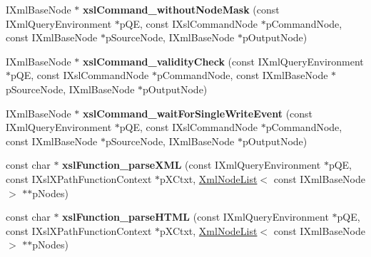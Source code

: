 \begin{DoxyCompactItemize}
\item 
\hypertarget{group__XSLModule-Commands_ga0ed207ec17eee242bc51cd8238386916}{\-I\-Xml\-Base\-Node $\ast$ {\bfseries xsl\-Command\-\_\-without\-Node\-Mask} (const \-I\-Xml\-Query\-Environment $\ast$p\-Q\-E, const \-I\-Xsl\-Command\-Node $\ast$p\-Command\-Node, const \-I\-Xml\-Base\-Node $\ast$p\-Source\-Node, \-I\-Xml\-Base\-Node $\ast$p\-Output\-Node)}\label{group__XSLModule-Commands_ga0ed207ec17eee242bc51cd8238386916}

\item 
\hypertarget{group__XSLModule-Commands_ga8fd8810e91d25af972b38b80036763c5}{\-I\-Xml\-Base\-Node $\ast$ {\bfseries xsl\-Command\-\_\-validity\-Check} (const \-I\-Xml\-Query\-Environment $\ast$p\-Q\-E, const \-I\-Xsl\-Command\-Node $\ast$p\-Command\-Node, const \-I\-Xml\-Base\-Node $\ast$p\-Source\-Node, \-I\-Xml\-Base\-Node $\ast$p\-Output\-Node)}\label{group__XSLModule-Commands_ga8fd8810e91d25af972b38b80036763c5}

\item 
\hypertarget{group__XSLModule-Commands_ga6d37d1c0b9f784350381cee223d718da}{\-I\-Xml\-Base\-Node $\ast$ {\bfseries xsl\-Command\-\_\-wait\-For\-Single\-Write\-Event} (const \-I\-Xml\-Query\-Environment $\ast$p\-Q\-E, const \-I\-Xsl\-Command\-Node $\ast$p\-Command\-Node, const \-I\-Xml\-Base\-Node $\ast$p\-Source\-Node, \-I\-Xml\-Base\-Node $\ast$p\-Output\-Node)}\label{group__XSLModule-Commands_ga6d37d1c0b9f784350381cee223d718da}

\item 
\hypertarget{group__XSLModule-Functions_gae9e04d1f2be6512c427ead0773aa00ee}{const char $\ast$ {\bfseries xsl\-Function\-\_\-parse\-X\-M\-L} (const \-I\-Xml\-Query\-Environment $\ast$p\-Q\-E, const \-I\-Xsl\-X\-Path\-Function\-Context $\ast$p\-X\-Ctxt, \hyperlink{classgeneral__server_1_1XmlNodeList}{\-Xml\-Node\-List}$<$ const \-I\-Xml\-Base\-Node $>$ $\ast$$\ast$p\-Nodes)}\label{group__XSLModule-Functions_gae9e04d1f2be6512c427ead0773aa00ee}

\item 
\hypertarget{group__XSLModule-Functions_ga8bec6b68e06850ec2a73e6c8cb190972}{const char $\ast$ {\bfseries xsl\-Function\-\_\-parse\-H\-T\-M\-L} (const \-I\-Xml\-Query\-Environment $\ast$p\-Q\-E, const \-I\-Xsl\-X\-Path\-Function\-Context $\ast$p\-X\-Ctxt, \hyperlink{classgeneral__server_1_1XmlNodeList}{\-Xml\-Node\-List}$<$ const \-I\-Xml\-Base\-Node $>$ $\ast$$\ast$p\-Nodes)}\label{group__XSLModule-Functions_ga8bec6b68e06850ec2a73e6c8cb190972}


\end{DoxyCompactItemize}
